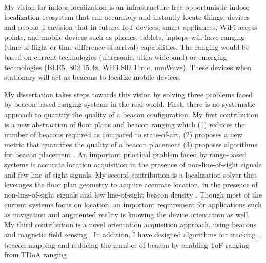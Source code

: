 \documentclass[10pt]{article}
\begin{document}


My vision for indoor localization is  an infrastructure-free opportunistic indoor localization ecosystem that can accurately and instantly locate things, devices and people. I envision that in future, IoT devices, smart appliances, WiFi access points, and mobile devices such as phones, tablets, laptops will have ranging (time-of-flight or time-difference-of-arrival) capabilities. The ranging would be based on current technologies (ultrasonic, ultra-wideband) or emerging technologies (BLE5, 802.15.4z, WiFi 802.11mc, mmWave). These devices when stationary will act as beacons to localize mobile devices. %


My dissertation takes steps towards this vision by solving three problems faced by beacon-based ranging systems in the real-world. First, there is no systematic approach to quantify the quality of a beacon configuration. 
My first contribution is a new abstraction of floor plans and beacon ranging which (1) reduces the number of beacons required as compared to state-of-art, (2) proposes a new metric that quantifies the quality of a beacon placement (3) proposes algorithms for beacon placement \cite{rajagopal2016beacon}. An important practical problem faced by range-based systems is accurate location acquisition in the presence of non-line-of-sight signals and few line-of-sight signals. My second contribution is a localization solver that leverages the floor plan geometry to acquire accurate location, in the presence of non-line-of-sight signals and low line-of-sight beacon density \cite{rajagopal2018enhancing}. Though most of the current systems focus on location, an important requirement for applications such as navigation and augmented reality is knowing the device orientation as well. My third contribution is a novel orientation acquisition approach, using beacons and magnetic field sensing \cite{mobileAR}. In addition, I have designed algorithms for tracking \cite{lazik2015alps}, beacon mapping \cite{lazik2015alps,mobileAR} and reducing the number of beacon by enabling ToF ranging from TDoA ranging \cite{rtas-alps-platform}\\
\end{document}
